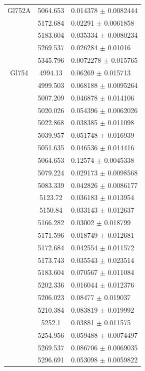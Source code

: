 \begin{longtable}{|c|c|l|}
\hline                                          
Gl752A & 5064.653 & 0.014378 $\pm$ 0.0082444 \\ 
 & 5172.684 & 0.02291 $\pm$ 0.0061858 \\        
 & 5183.604 & 0.035334 $\pm$ 0.0080234 \\       
 & 5269.537 & 0.026284 $\pm$ 0.01016 \\         
 & 5345.796 & 0.0072278 $\pm$ 0.015765 \\       
\hline                                          
Gl754 & 4994.13 & 0.06269 $\pm$ 0.015713 \\     
 & 4999.503 & 0.068188 $\pm$ 0.0095264 \\       
 & 5007.209 & 0.046878 $\pm$ 0.014106 \\        
 & 5020.026 & 0.054396 $\pm$ 0.0062026 \\       
 & 5022.868 & 0.038385 $\pm$ 0.011098 \\        
 & 5039.957 & 0.051748 $\pm$ 0.016939 \\        
 & 5051.635 & 0.046536 $\pm$ 0.014416 \\        
 & 5064.653 & 0.12574 $\pm$ 0.0045338 \\        
 & 5079.224 & 0.029173 $\pm$ 0.0098568 \\       
 & 5083.339 & 0.042826 $\pm$ 0.0086177 \\       
 & 5123.72 & 0.036183 $\pm$ 0.013954 \\         
 & 5150.84 & 0.033143 $\pm$ 0.012637 \\         
 & 5166.282 & 0.03002 $\pm$ 0.018799 \\         
 & 5171.596 & 0.018749 $\pm$ 0.012681 \\        
 & 5172.684 & 0.042554 $\pm$ 0.011572 \\        
 & 5173.743 & 0.035543 $\pm$ 0.023514 \\        
 & 5183.604 & 0.070567 $\pm$ 0.011084 \\        
 & 5202.336 & 0.016044 $\pm$ 0.012376 \\        
 & 5206.023 & 0.08477 $\pm$ 0.019037 \\         
 & 5210.384 & 0.083819 $\pm$ 0.019992 \\        
 & 5252.1 & 0.03881 $\pm$ 0.011575 \\           
 & 5254.956 & 0.059488 $\pm$ 0.0074497 \\       
 & 5269.537 & 0.086706 $\pm$ 0.0069035 \\       
 & 5296.691 & 0.053098 $\pm$ 0.0059822 \\       

\end{longtable}
